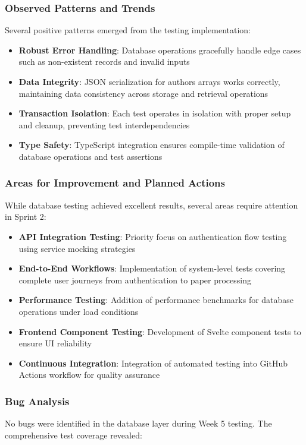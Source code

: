 \documentclass[12pt]{article}
\begin{document}
\subsubsection{Observed Patterns and Trends}
Several positive patterns emerged from the testing implementation:

\begin{itemize}
  \item \textbf{Robust Error Handling}: Database operations gracefully handle edge cases such as non-existent records and invalid inputs
  \item \textbf{Data Integrity}: JSON serialization for authors arrays works correctly, maintaining data consistency across storage and retrieval operations  
  \item \textbf{Transaction Isolation}: Each test operates in isolation with proper setup and cleanup, preventing test interdependencies
  \item \textbf{Type Safety}: TypeScript integration ensures compile-time validation of database operations and test assertions
\end{itemize}

\subsubsection{Areas for Improvement and Planned Actions}
While database testing achieved excellent results, several areas require attention in Sprint 2:

\begin{itemize}
  \item \textbf{API Integration Testing}: Priority focus on authentication flow testing using service mocking strategies
  \item \textbf{End-to-End Workflows}: Implementation of system-level tests covering complete user journeys from authentication to paper processing
  \item \textbf{Performance Testing}: Addition of performance benchmarks for database operations under load conditions
  \item \textbf{Frontend Component Testing}: Development of Svelte component tests to ensure UI reliability
  \item \textbf{Continuous Integration}: Integration of automated testing into GitHub Actions workflow for quality assurance
\end{itemize}

\subsubsection{Bug Analysis}
No bugs were identified in the database layer during Week 5 testing. The comprehensive test coverage revealed:
\end{document}
